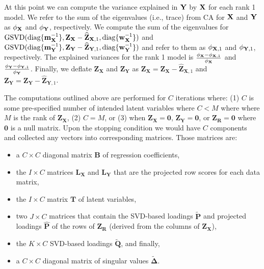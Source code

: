 \documentclass[12pt]{article}
\begin{document}
At this point we can compute the variance explained in \({\bf Y}\) by
\({\bf X}\) for each rank 1 model. We refer to the sum of the
eigenvalues (i.e., trace) from CA for \({\bf X}\) and \({\bf Y}\) as
\({\phi}_{\bf X}\) and \({\phi}_{\bf Y}\), respectively. We compute the
sum of the eigenvalues for
\(\mathrm{GSVD(} \mathrm{diag\{} {\mathbf m}_{\bf X}^{-1} \mathrm{\}}, {\mathbf Z}_{\mathbf X} - \widehat{\mathbf Z}_{{\mathbf X},1}, \mathrm{diag\{} {\mathbf w}_{\bf X}^{-1}\mathrm{\}} \mathrm{)}\)
and
\(\mathrm{GSVD(} \mathrm{diag\{} {\mathbf m}_{\bf Y}^{-1} \mathrm{\}}, {\mathbf Z}_{\mathbf Y} - \widehat{\mathbf Z}_{{\mathbf Y},1}, \mathrm{diag\{} {\mathbf w}_{\bf Y}^{-1}\mathrm{\}} \mathrm{)}\)
and refer to them as \({\phi}_{{\bf X},1}\) and \({\phi}_{{\bf Y},1}\),
respectively. The explained variances for the rank 1 model is
\(\frac{{\phi}_{\bf X} - {\phi}_{{\bf X},1}}{{\phi}_{\bf X}}\) and
\(\frac{{\phi}_{\bf Y} - {\phi}_{{\bf Y},1}}{{\phi}_{\bf Y}}\). Finally,
we deflate \({\mathbf Z}_{\mathbf X}\) and \({\mathbf Z}_{\mathbf Y}\)
as
\({\mathbf Z}_{\mathbf X} = {\mathbf Z}_{\mathbf X} - \widehat{\mathbf Z}_{{\mathbf X},1}\)
and
\({\mathbf Z}_{\mathbf Y} = {\mathbf Z}_{\mathbf Y} - \widehat{\mathbf Z}_{{\mathbf Y},1}\).

The computations outlined above are performed for \(C\) iterations
where: (1) \(C\) is some pre-specified number of intended latent
variables where \(C < M\) where where \(M\) is the rank of
\({\mathbf Z}_{\mathbf X}\), (2) \(C=M\), or (3) when
\({\mathbf Z}_{\mathbf X} = {\mathbf 0}\),
\({\mathbf Z}_{\mathbf Y} = {\mathbf 0}\), or
\({\mathbf Z}_{\mathbf R} = {\mathbf 0}\) where \({\mathbf 0}\) is a
null matrix. Upon the stopping condition we would have \(C\) components
and collected any vectors into corresponding matrices. Those matrices
are:

\begin{itemize}
\item
  a \(C \times C\) diagonal matrix \({\mathbf B}\) of regression
  coefficients,
\item
  the \(I \times C\) matrices \({\mathbf L}_{\mathbf X}\) and
  \({\mathbf L}_{\mathbf Y}\) that are the projected row scores for each
  data matrix,
\item
  the \(I \times C\) matrix \({\mathbf T}\) of latent variables,
\item
  two \(J \times C\) matrices that contain the SVD-based loadings
  \(\widetilde{\mathbf P}\) and projected loadings
  \(\widehat{\mathbf P}\) of the rows of \({\mathbf Z}_{\mathbf R}\)
  (derived from the columns of \({\mathbf Z}_{\mathbf X}\)),
\item
  the \(K \times C\) SVD-based loadings \(\widetilde{\mathbf Q}\), and
  finally,
\item
  a \(C \times C\) diagonal matrix of singular values
  \(\widetilde{\boldsymbol \Delta}\).
\end{itemize}
\end{document}
